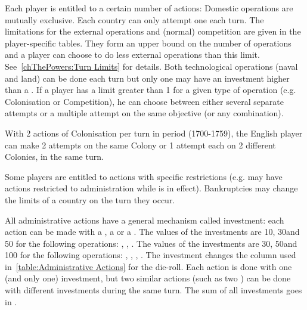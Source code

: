  \label{chExpenses:Administrative Limits} Each
player is entitled to a certain number of actions:
\bparag Domestic operations are mutually exclusive. Each country can only
attempt one each turn.
\bparag The limitations for the external operations and (normal) competition
are given in the player-specific tables. They form an upper bound on the
number of operations and a player can choose to do less external operations
than this limit. See~\ref{chThePowers:Turn Limits} for details.
\bparag Both technological operations (naval and land) can be done each turn
but only one may have an investment higher than a .
\bparag If a player has a limit greater than 1 for a given type of operation
(e.g. Colonisation or Competition), he can choose between either several
separate attempts or a multiple attempt on the same objective (or any
combination).
\begin{exemple}
  With 2 actions of Colonisation per turn in period  (1700-1759),
  the English player can make 2 attempts on the same Colony or 1 attempt each
  on 2 different Colonies, in the same turn.
\end{exemple}
\bparag Some players are entitled to actions with specific restrictions
(e.g. \SPA may have actions restricted to \POR administration while
 is in effect).
\bparag Bankruptcies may change the limits of a country on the turn they
occur.

\aparag[Investment] All administrative actions have a general mechanism called
investment: each action can be made with a , a
 or a .
\bparag The values of the investments are 10\ducats, 30\ducats and 50\ducats
for the following operations: ,
, .
\bparag The values of the investments are 30\ducats, 50\ducats and 100\ducats
for the following operations: , , , .
\bparag The investment changes the column used in~\ref{table:Administrative
  Actions} for the die-roll. Each action is done with one (and only one)
investment, but two similar actions (such as two ) can be
done with different investments during the same turn.
\bparag The sum of all investments goes in .

